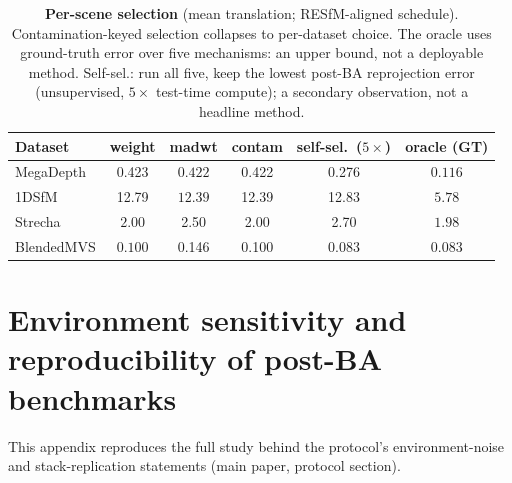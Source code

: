 \documentclass[10pt,twocolumn,letterpaper]{article}
\begin{document}
\begin{table}[t]\centering\footnotesize
\setlength{\tabcolsep}{3pt}%
\caption{\textbf{Per-scene selection} (mean translation; RESfM-aligned schedule).
Contamination-keyed selection collapses to per-dataset choice. The oracle uses
ground-truth error over five mechanisms: an upper bound, not a deployable method.
Self-sel.: run all five, keep the lowest post-BA reprojection error (unsupervised,
$5\times$ test-time compute); a secondary observation, not a headline method.}
\label{tab:selector}
\begin{tabular}{lccccc}
\toprule
Dataset & weight & madwt & contam & self-sel.\ ($5\times$) & oracle (GT)\\
\midrule
MegaDepth  & 0.423 & $\mathbf{0.422}$ & 0.422 & 0.276 & $\mathit{0.116}$\\
1DSfM      & 12.79 & $\mathbf{12.39}$ & 12.39 & 12.83 & $\mathit{5.78}$\\
Strecha    & $\mathbf{2.00}$ & 2.50 & 2.00 & 2.70 & $\mathit{1.98}$\\
BlendedMVS & $\mathbf{0.100}$ & 0.146 & 0.100 & 0.083 & $\mathit{0.083}$\\
\bottomrule
\end{tabular}
\end{table}


\clearpage
\section{Environment sensitivity and reproducibility of post-BA benchmarks}\label{app:repro}
This appendix reproduces the full study behind the protocol's environment-noise and
stack-replication statements (main paper, protocol section).
\end{document}
